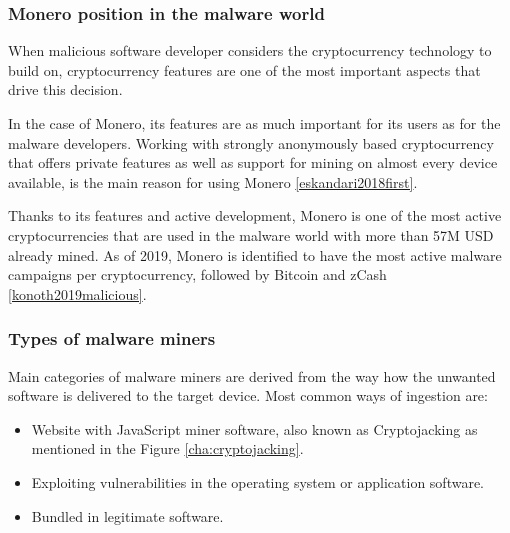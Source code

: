\documentclass[
  printed, %
  table,   %
  lof,     %
  lot,     %
           oneside, color
]{fithesis3}
\begin{document}
\subsubsection{Monero position in the malware world}
When malicious software developer considers the cryptocurrency technology to build on, cryptocurrency features are one of the most important aspects that drive this decision.

In the case of Monero, its features are as much important for its users as for the malware developers. Working with strongly anonymously based cryptocurrency that offers private features as well as support for mining on almost every device available, is the main reason for using Monero \ref{eskandari2018first}.

Thanks to its features and active development, Monero is one of the most active cryptocurrencies that are used in the malware world with more than 57M USD already mined. As of 2019, Monero is identified to have the most active malware campaigns per cryptocurrency, followed by Bitcoin and zCash \ref{konoth2019malicious}.
\vspace{-0.6em}
\subsubsection{Types of malware miners}
Main categories of malware miners are derived from the way how the unwanted software is delivered to the target device. Most common ways of ingestion are:
\begin{itemize}
\itemsep0em
\item Website with JavaScript miner software, also known as Cryptojacking as mentioned in the Figure \ref{cha:cryptojacking}. 
\item Exploiting vulnerabilities in the operating system or application software.
\item Bundled in legitimate software.
\end{itemize}


\end{document}
